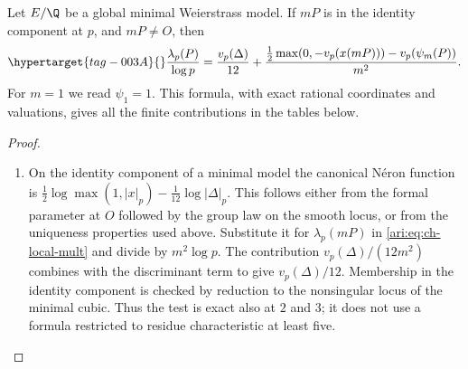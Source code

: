 \begin{proposition}\hypertarget{tag-000W}{}\label{ari:C.6.2}

Let $E/\Q$ be a global minimal Weierstrass model. If $mP$ is
in the identity component at $p$, and $mP\ne O$, then
\begin{equation}\hypertarget{tag-003A}{}\label{ari:eq:ch-local-exact}
 \frac{\lambda_p(P)}{\log p}
 =\frac{v_p(\Delta)}{12}
   +\frac{\frac12\max(0,-v_p(x(mP)))-v_p(\psi_m(P))}{m^2}.
\end{equation}
For $m=1$ we read $\psi_1=1$. This formula, with exact rational
coordinates and valuations, gives all the finite contributions
in the tables below.
\end{proposition}


\begin{proof}
\begin{enumerate}[label=\arabic*.,leftmargin=*]
\item On the identity component of a minimal model the canonical
N\'eron function is
$\frac12\log\max(1,|x|_p)-\frac1{12}\log|\Delta|_p$.
This follows either from the formal parameter at $O$ followed
by the group law on the smooth locus, or from the uniqueness
properties used above. Substitute it for $\lambda_p(mP)$ in
\eqref{ari:eq:ch-local-mult} and divide by $m^2\log p$.
The contribution $v_p(\Delta)/(12m^2)$ combines with the
discriminant term to give $v_p(\Delta)/12$.
Membership in the identity component is checked by reduction
to the nonsingular locus of the minimal cubic. Thus the test is
exact also at $2$ and $3$; it does not use a formula restricted
to residue characteristic at least five.
\end{enumerate}
\end{proof}